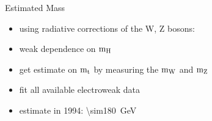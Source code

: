 \begin{frame}{Estimated Mass}

	\begin{itemize}\itemfill
		\item using radiative corrections of the W, Z bosons:
	\end{itemize}
	
	\begin{figure}\vspace*{-10pt}
		\centering
	\end{figure}\vspace*{-10pt}
	
	\begin{minipage}[c][.35\textheight]{.6\textwidth}
		\begin{itemize}\itemfill
			\item weak dependence on $\text{m}_{\text{H}}$
			\item get estimate on $\text{m}_{\text{t}}$ by measuring the $\text{m}_{\text{W}}$ and $\text{m}_{\text{Z}}$
			\item fit all available electroweak data
			\item estimate in 1994: \SI{\sim180}{\giga\electronvolt}
		\end{itemize}
	\end{minipage}
	\begin{minipage}{.35\textwidth}
	\end{minipage}

\end{frame}
